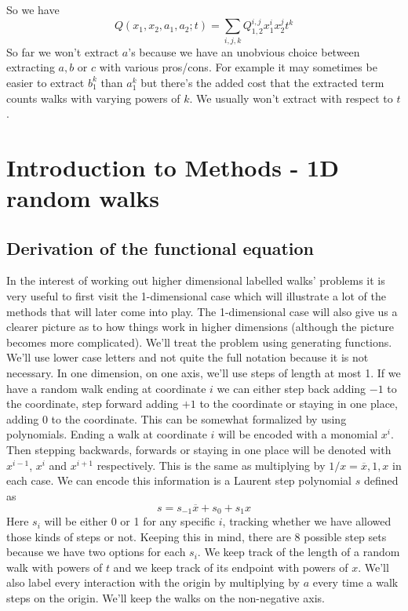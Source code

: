 \documentclass[12pt]{article}
\theoremstyle{definition} \newtheorem{definition}[theorem]{Definition}
\newcommand{\ol}[1]{\overline{#1}}
\newcommand{\Qf}[1]{Q_{1,2}^{#1}}
\begin{document}
So we have
\[
	Q(x_1,x_2,a_1,a_2;t) = \sum_{i,j,k} \Qf{i,j}x_1^i x_2^j t^k
\]
So far we won't extract $a$'s because we have an unobvious choice between extracting $a,b$ or $c$ with various pros/cons. For example it may sometimes be easier to extract $b_1^k$ than $a_1^k$ but there's the added cost that the extracted term counts walks with varying powers of $k$. We usually won't extract with respect to $t$.

\section{Introduction to Methods - 1D random walks}
\subsection{Derivation of the functional equation}

In the interest of working out higher dimensional labelled walks' problems it is very useful to first visit the 1-dimensional case which will illustrate a lot of the methods that will later come into play. The 1-dimensional case will also give us a clearer picture as to how things work in higher dimensions (although the picture becomes more complicated). We'll treat the problem using generating functions. We'll use lower case letters and not quite the full notation because it is not necessary. In one dimension, on one axis, we'll use steps of length at most 1. If we have a random walk ending at coordinate $i$ we can either step back adding $-1$ to the coordinate, step forward adding $+1$ to the coordinate or staying in one place, adding $0$ to the coordinate. This can be somewhat formalized by using polynomials. Ending a walk at coordinate $i$ will be encoded with a monomial $x^i$. Then stepping backwards, forwards or staying in one place will be denoted with $x^{i-1}$, $x^i$ and $x^{i+1}$ respectively. This is the same as multiplying by $1/x = \ol{x}, 1, x$ in each case. We can encode this information is a Laurent step polynomial $s$ defined as
\[
	s = s_{-1}\ol{x} + s_0 + s_1 x
\]
Here $s_i$ will be either 0 or 1 for any specific $i$, tracking whether we have allowed those kinds of steps or not. Keeping this in mind, there are 8 possible step sets because we have two options for each $s_i$. We keep track of the length of a random walk with powers of $t$ and we keep track of its endpoint with powers of $x$. We'll also label every interaction with the origin by multiplying by $a$ every time a walk steps on the origin. We'll keep the walks on the non-negative axis.
\end{document}
